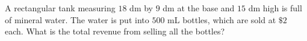 A rectangular tank measuring $18$ dm by $9$ dm at the base and $15$ dm high is full of mineral water. The water is put into $500$ mL bottles, which are sold at $\$2$ each. What is the total revenue from selling all the bottles?
